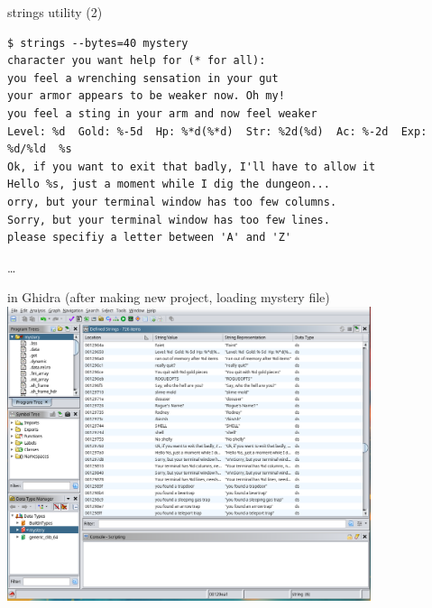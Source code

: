 \begin{frame}[fragile]{strings utility (2)}
\begin{Verbatim}[fontsize=\fontsize{9}{10}]
$ strings --bytes=40 mystery
character you want help for (* for all):
you feel a wrenching sensation in your gut
your armor appears to be weaker now. Oh my!
you feel a sting in your arm and now feel weaker
Level: %d  Gold: %-5d  Hp: %*d(%*d)  Str: %2d(%d)  Ac: %-2d  Exp: %d/%ld  %s
Ok, if you want to exit that badly, I'll have to allow it
Hello %s, just a moment while I dig the dungeon...
orry, but your terminal window has too few columns.
Sorry, but your terminal window has too few lines.
please specifiy a letter between 'A' and 'Z'
\end{Verbatim}
\ldots
\end{frame}

\begin{frame}{in Ghidra}
\small (after making new project, loading mystery file) \\
\includegraphics[width=0.8\textwidth]{../re-tools/ghidra-strings-mystery-ex}
\end{frame}

